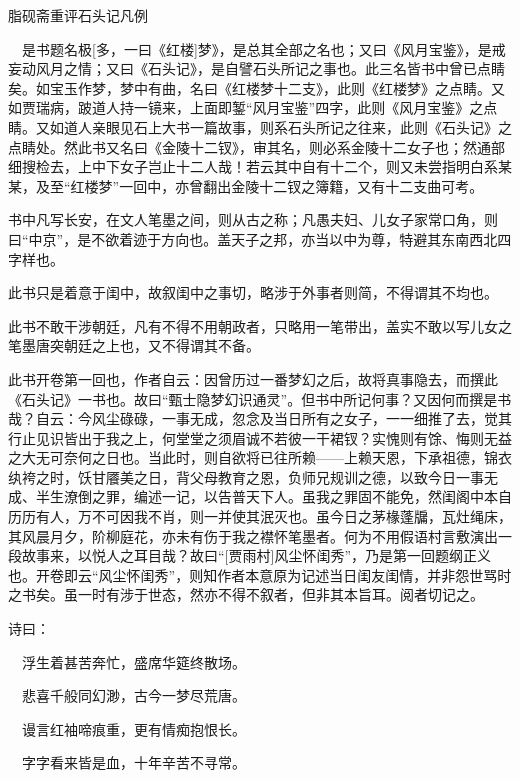 \newpage

\begin{center}
	{\Huge \heiti 脂砚斋重评石头记凡例}
\end{center}



{　是书题名极{[}多，一曰《红楼]\kaishu 梦》，是总其全部之名也；又曰《风月宝鉴》，是戒妄动风月之情；又曰《石头记》，是自譬石头所记之事也。此三名皆书中曾已点睛矣。如宝玉作梦，梦中有曲，名曰《红楼梦十二支》，此则《红楼梦》之点睛。又如贾瑞病，跛道人持一镜来，上面即錾``风月宝鉴''四字，此则《风月宝鉴》之点睛。又如道人亲眼见石上大书一篇故事，则系石头所记之往来，此则《石头记》之点睛处。然此书又名曰《金陵十二钗》，审其名，则必系金陵十二女子也；然通部细搜检去，上中下女子岂止十二人哉！若云其中自有十二个，则又未尝指明白系某某，及至``红楼梦''一回中，亦曾翻出金陵十二钗之簿籍，又有十二支曲可考。}

{\kaishu 书中凡写长安，在文人笔墨之间，则从古之称；凡愚夫妇、儿女子家常口角，则曰``中京''，是不欲着迹于方向也。盖天子之邦，亦当以中为尊，特避其东南西北四字样也。}

{\kaishu 此书只是着意于闺中，故叙闺中之事切，略涉于外事者则简，不得谓其不均也。}

{\kaishu 此书不敢干涉朝廷，凡有不得不用朝政者，只略用一笔带出，盖实不敢以写儿女之笔墨唐突朝廷之上也，又不得谓其不备。}

{\kaishu 此书开卷第一回也，作者自云：因曾历过一番梦幻之后，故将真事隐去，而撰此《石头记》一书也。故曰``甄士隐梦幻识通灵''。但书中所记何事？又因何而撰是书哉？自云：今风尘碌碌，一事无成，忽念及当日所有之女子，一一细推了去，觉其行止见识皆出于我之上，何堂堂之须眉诚不若彼一干裙钗？实愧则有馀、悔则无益之大无可奈何之日也。当此时，则自欲将已往所赖------上赖天恩，下承祖德，锦衣纨袴之时，饫甘餍美之日，背父母教育之恩，负师兄规训之德，以致今日一事无成、半生潦倒之罪，编述一记，以告普天下人。虽我之罪固不能免，然闺阁中本自历历有人，万不可因我不肖，则一并使其泯灭也。虽今日之茅椽蓬牖，瓦灶绳床，其风晨月夕，阶柳庭花，亦未有伤于我之襟怀笔墨者。何为不用假语村言敷演出一段故事来，以悦人之耳目哉？故曰``{[}贾雨村{]}风尘怀闺秀''，乃是第一回题纲正义也。开卷即云``风尘怀闺秀''，则知作者本意原为记述当日闺友闺情，并非怨世骂时之书矣。虽一时有涉于世态，然亦不得不叙者，但非其本旨耳。阅者切记之。}

{\kaishu 诗曰：}

{\kaishu 　浮生着甚苦奔忙，盛席华筵终散场。}

{\kaishu 　悲喜千般同幻渺，古今一梦尽荒唐。}

{\kaishu 　谩言红袖啼痕重，更有情痴抱恨长。}

{\kaishu 　字字看来皆是血，十年辛苦不寻常。}

